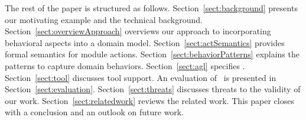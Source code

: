 The rest of the paper is structured as follows. Section~\ref{sect:background} presents our motivating example and the technical background. 
Section~\ref{sect:overviewApproach} overviews our approach to incorporating behavioral aspects into a domain model. 
Section~\ref{sect:actSemantics} provides formal semantics for module actions. Section~\ref{sect:behaviorPatterns} explains the patterns to capture domain behaviors.  
Section~\ref{sect:agl} specifies \agl. 
Section~\ref{sect:tool} discusses tool support.
An evaluation of \agl~is presented in Section~\ref{sect:evaluation}. Section~\ref{sect:threats} discusses threats to the validity of our work.
Section~\ref{sect:relatedwork} reviews the related work. This paper closes with a conclusion and an outlook on future work.
